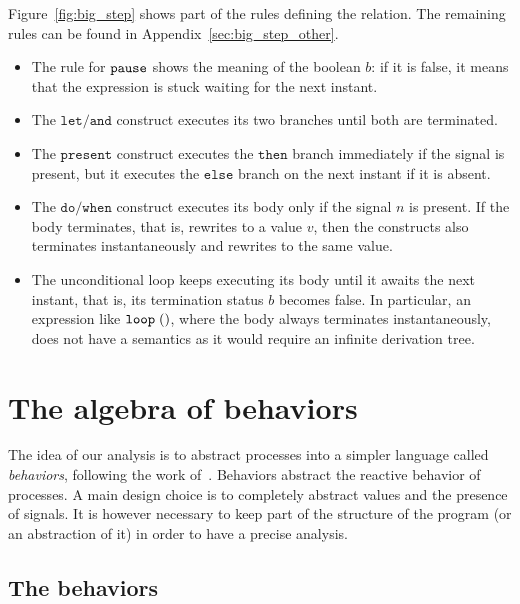 \documentclass[9pt,preprint]{sigplanconf}
\begin{document}
Figure~\ref{fig:big_step} shows part of the rules defining the relation. The remaining rules can be found in Appendix~\ref{sec:big_step_other}. 
\begin{itemize}
\item  The rule for $\mathtt{pause}{}$ shows the meaning of the boolean $b$: if it is false, it means that the expression is stuck waiting for the next instant.
\item The $\mathtt{let}/\mathtt{and}$ construct executes its two branches until both are terminated.
\item The $\mathtt{present}$ construct executes the $\mathtt{then}$ branch immediately if the signal is present, but it executes the $\mathtt{else}$ branch on the next instant if it is absent.
\item The $\mathtt{do/when}$ construct executes its body only if the signal $n$ is present. If the body terminates, that is, rewrites to a value $v$, then the constructs also terminates instantaneously and rewrites to the same value.
\item The unconditional loop keeps executing its body until it awaits the next instant, that is, its termination status $b$ becomes false. In particular, an expression like $\mathtt{loop}\; \mathtt{()}{}$, where the body always terminates instantaneously, does not have a semantics as it would require an infinite derivation tree.
\end{itemize}

\begin{figure*}



\caption{Big-step semantics}
\label{fig:big_step}
\end{figure*}

\section{The algebra of behaviors}
\label{sec:behaviors}

The idea of our analysis is to abstract processes into a simpler language called \emph{behaviors}, following the work of~\cite{Amtoft:1999}. Behaviors abstract the reactive behavior of processes. A main design choice is to completely abstract values and the presence of signals. It is however necessary to keep part of the structure of the program (or an abstraction of it) in order to have a precise analysis.

\subsection{The behaviors}
\end{document}
